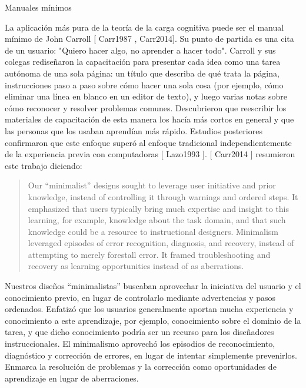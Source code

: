 Manuales mínimos

La aplicación más pura de la teoría de la carga cognitiva puede ser el manual mínimo de John Carroll  [ Carr1987 , Carr2014]. Su punto de partida es una cita de un usuario: "Quiero hacer algo, no aprender a hacer todo". Carroll y sus colegas rediseñaron la capacitación para presentar cada idea como una tarea autónoma de una sola página: un título que describa de qué trata la página, instrucciones paso a paso sobre cómo hacer una sola cosa (por ejemplo, cómo eliminar una línea en blanco en un editor de texto), y luego varias notas sobre cómo reconocer y resolver problemas comunes. Descubrieron que reescribir los materiales de capacitación de esta manera los hacía más cortos en general y que las personas que los usaban aprendían más rápido. Estudios posteriores confirmaron que este enfoque superó al enfoque tradicional independientemente de la experiencia previa con computadoras [ Lazo1993 ]. [ Carr2014 ] resumieron este trabajo diciendo:

\begin{quote}

  Our ``minimalist'' designs sought to leverage user initiative and prior knowledge,
  instead of controlling it through warnings and ordered steps.
  It emphasized that users typically bring much expertise and insight to this learning,
  for example,
  knowledge about the task domain,
  and that such knowledge could be a resource to instructional designers.
  Minimalism leveraged episodes of error recognition, diagnosis, and recovery,
  instead of attempting to merely forestall error.
  It framed troubleshooting and recovery as learning opportunities instead of as aberrations.

\end{quote}

Nuestros diseños “minimalistas” buscaban aprovechar la iniciativa del usuario y el conocimiento previo, en lugar de controlarlo mediante advertencias y pasos ordenados. Enfatizó que los usuarios generalmente aportan mucha experiencia y conocimiento a este aprendizaje, por ejemplo, conocimiento sobre el dominio de la tarea, y que dicho conocimiento podría ser un recurso para los diseñadores instruccionales. El minimalismo aprovechó los episodios de reconocimiento, diagnóstico y corrección de errores, en lugar de intentar simplemente prevenirlos. Enmarca la resolución de problemas y la corrección como oportunidades de aprendizaje en lugar de aberraciones.


